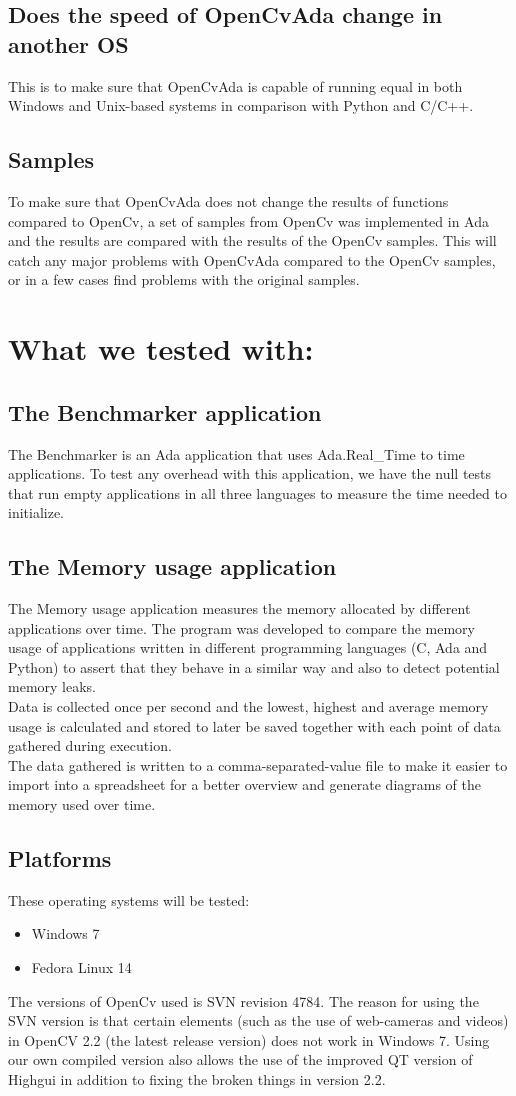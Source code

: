 \subsection{Does the speed of OpenCvAda change in another OS}
This is to make sure that OpenCvAda is capable of running equal in both Windows and Unix-based systems in comparison with Python and C/C++. 
\subsection{Samples}
To make sure that OpenCvAda does not change the results of functions compared to OpenCv, a set of samples from OpenCv was implemented in Ada and the results are compared with the results of the OpenCv samples. This will catch any major problems with OpenCvAda compared to the OpenCv samples, or in a few cases find problems with the original samples.
\section{What we tested with:}
\subsection{The Benchmarker application}
The Benchmarker is an Ada application that uses Ada.Real_Time to time applications. To test any overhead with this application, we have the null tests that run empty applications in all three languages to measure the time needed to initialize.
\subsection{The Memory usage application}
The Memory usage application measures the memory allocated by different applications over time. The program was developed to compare the memory usage of applications written in different programming languages (C, Ada and Python) to assert that they behave in a similar way and also to detect potential memory leaks.
\\
Data is collected once per second and the lowest, highest and average memory usage is calculated and stored to later be saved together with each point of data gathered during execution.
\\
The data gathered is written to a comma-separated-value file to make it easier to import into a spreadsheet for a better overview and generate diagrams of the memory used over time.
\subsection{Platforms}
These operating systems will be tested:
\begin{itemize}
\item Windows 7\cite{win7}
\item Fedora Linux 14\cite{fedora}
\end{itemize}
The versions of OpenCv used is SVN revision 4784. The reason for using the SVN version is that certain elements (such as the use of web-cameras and videos) in OpenCV 2.2 (the latest release version) does not work in Windows 7. Using our own compiled version also allows the use of the improved QT version of Highgui in addition to fixing the broken things in version 2.2.

